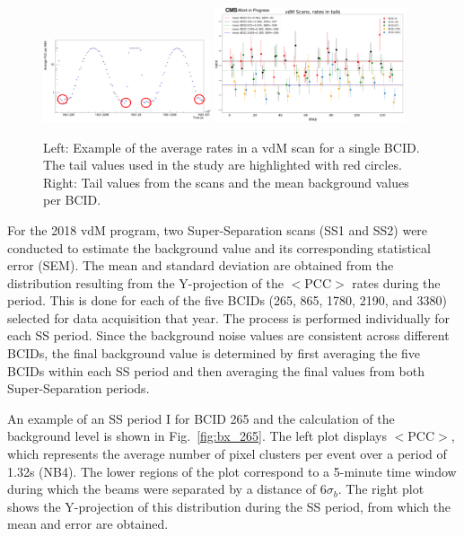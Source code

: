 \begin{figure}[h]
    \centering
    \includegraphics[width=0.44\textwidth,height=0.27\textwidth]{Chapter4/scan_rates.png}
    \includegraphics[width=0.5\textwidth,height=0.30\textwidth]{Chapter4/scan_rates_PerBX.png}
    \caption[Background Per BCID (2017)]{Left: Example of the average rates in a vdM scan for a single BCID. The tail values used in the study are highlighted with red circles. Right: Tail values from the scans and the mean background values per BCID.}
    \label{fig:SS_rates}
\end{figure}


For the 2018 vdM program, two Super-Separation scans (SS1 and SS2) were conducted to estimate the background value and its corresponding statistical error (SEM). The mean and standard deviation are obtained from the distribution resulting from the Y-projection of the $<\text{PCC}>$ rates during the period. This is done for each of the five BCIDs (265, 865, 1780, 2190, and 3380) selected for data acquisition that year. The process is performed individually for each SS period. Since the background noise values are consistent across different BCIDs, the final background value is determined by first averaging the five BCIDs within each SS period and then averaging the final values from both Super-Separation periods.

An example of an SS period I for BCID 265 and the calculation of the background level is shown in Fig.~\ref{fig:bx_265}. The left plot displays $<\text{PCC}>$, which represents the average number of pixel clusters per event over a period of 1.32s (NB4). The lower regions of the plot correspond to a 5-minute time window during which the beams were separated by a distance of $6\sigma_{b}$. The right plot shows the Y-projection of this distribution during the SS period, from which the mean and error are obtained.


